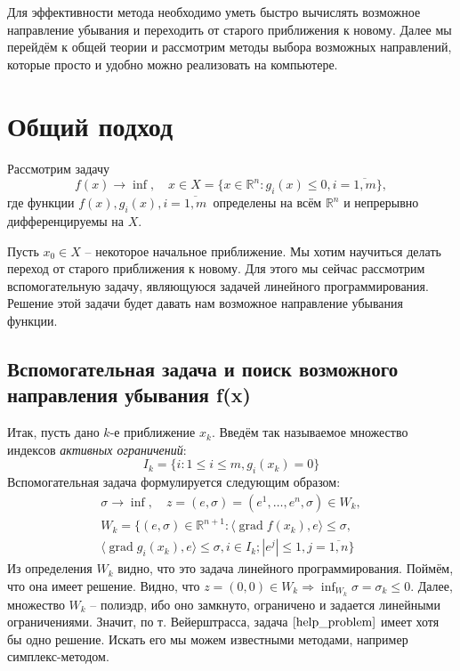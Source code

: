 \documentclass{article}
\theoremstyle{plain}
\theoremstyle{definition}
\DeclareMathOperator{\grad}{grad}
\begin{document}
Для эффективности метода необходимо уметь быстро вычислять возможное направление убывания и переходить от старого приближения к новому. Далее мы перейдём к общей теории и рассмотрим методы выбора возможных направлений, которые просто и удобно можно реализовать на компьютере.

\section{Общий подход}
Рассмотрим задачу
\begin{equation}
\label{problem}
f(x) \rightarrow \inf,\quad x \in X=\lbrace x \in \mathbb{R}^n : g_i(x)\leqslant 0, i=\overline{1,m}\rbrace,
\end{equation} где функции $f(x), g_i(x), i=\overline{1,m}\,$ определены на всём $\mathbb{R}^n$ и непрерывно дифференцируемы на $X$.

Пусть $x_0 \in X$ -- некоторое начальное приближение. Мы хотим научиться делать переход от старого приближения к новому. Для этого мы сейчас рассмотрим вспомогательную задачу, являющуюся задачей линейного программирования. Решение этой задачи будет давать нам возможное направление убывания функции.
\subsection{Вспомогательная задача и поиск возможного направления убывания f(x)}
Итак, пусть дано $k$-е приближение $x_k$. Введём так называемое множество индексов \textit{активных ограничений}:
\begin{equation*}
I_k = \lbrace i:1\leqslant i \leqslant m, g_i(x_k)=0\rbrace
\end{equation*}
Вспомогательная задача формулируется следующим образом:
\begin{multline}
\label{help_problem}
\sigma \rightarrow \inf,\quad z=(e, \sigma)=(e^1,\ldots,e^n,\sigma)\in W_k, \\
W_k = \lbrace (e,\sigma) \in \mathbb{R}^{n+1}: \langle \grad f(x_k), e \rangle \leqslant \sigma,\\
 \langle \grad g_i(x_k), e \rangle \leqslant \sigma, i \in I_k; |e^j| \leqslant 1, j=\overline{1,n} \rbrace   
\end{multline}
Из определения $W_k$ видно, что это задача линейного программирования. Поймём, что она имеет решение. Видно, что $z=(0,0) \in W_k \Rightarrow \inf_{W_k}\sigma = \sigma_k \leqslant 0$. Далее, множество $W_k$ -- полиэдр, ибо оно замкнуто, ограничено и задается линейными ограничениями. Значит, по т. Вейерштрасса, задача $\eqref{help_problem}$ имеет хотя бы одно решение. Искать его мы можем известными методами, например симплекс-методом.
\end{document}

